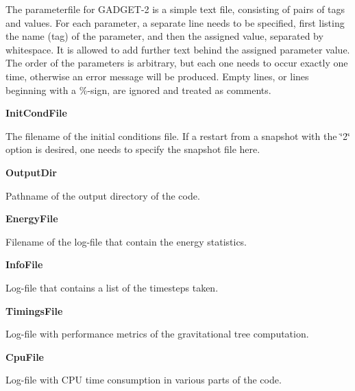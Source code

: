 The parameterfile for GADGET-\/2 is a simple text file, consisting of pairs of tags and values. For each parameter, a separate line needs to be specified, first listing the name (tag) of the parameter, and then the assigned value, separated by whitespace. It is allowed to add further text behind the assigned parameter value. The order of the parameters is arbitrary, but each one needs to occur exactly one time, otherwise an error message will be produced. Empty lines, or lines beginning with a \%-\/sign, are ignored and treated as comments.


\begin{DoxyItemize}
\item {\bfseries InitCondFile} \par
 The filename of the initial conditions file. If a restart from a snapshot with the \char`\"{}2\char`\"{} option is desired, one needs to specify the snapshot file here.
\end{DoxyItemize}


\begin{DoxyItemize}
\item {\bfseries OutputDir} \par
 Pathname of the output directory of the code.
\end{DoxyItemize}


\begin{DoxyItemize}
\item {\bfseries EnergyFile} \par
 Filename of the log-\/file that contain the energy statistics.
\end{DoxyItemize}


\begin{DoxyItemize}
\item {\bfseries InfoFile} \par
 Log-\/file that contains a list of the timesteps taken.
\end{DoxyItemize}


\begin{DoxyItemize}
\item {\bfseries TimingsFile} \par
 Log-\/file with performance metrics of the gravitational tree computation.
\end{DoxyItemize}


\begin{DoxyItemize}
\item {\bfseries CpuFile} \par
 Log-\/file with CPU time consumption in various parts of the code.
\end{DoxyItemize}


